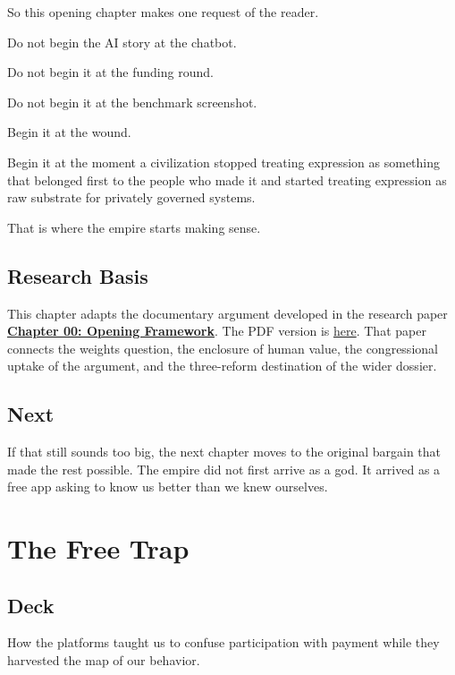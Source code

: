 \documentclass[
  american,
  12pt,
  letterpaper,
]{article}
\begin{document}
So this opening chapter makes one request of the reader.

Do not begin the AI story at the chatbot.

Do not begin it at the funding round.

Do not begin it at the benchmark screenshot.

Begin it at the wound.

Begin it at the moment a civilization stopped treating expression as
something that belonged first to the people who made it and started
treating expression as raw substrate for privately governed systems.

That is where the empire starts making sense.

\subsection{Research Basis}\label{research-basis}

This chapter adapts the documentary argument developed in the research
paper
\href{../../papers/html/00_opening-framework_paper.html}{\textbf{Chapter
00: Opening Framework}}. The PDF version is
\href{../../papers/pdf/00_opening-framework_paper/00_opening-framework_paper.pdf}{here}.
That paper connects the weights question, the enclosure of human value,
the congressional uptake of the argument, and the three-reform
destination of the wider dossier.

\subsection{Next}\label{next}

If that still sounds too big, the next chapter moves to the original
bargain that made the rest possible. The empire did not first arrive as
a god. It arrived as a free app asking to know us better than we knew
ourselves.

\section{The Free Trap}\label{the-free-trap}

\subsection{Deck}\label{deck-1}

How the platforms taught us to confuse participation with payment while
they harvested the map of our behavior.
\end{document}
